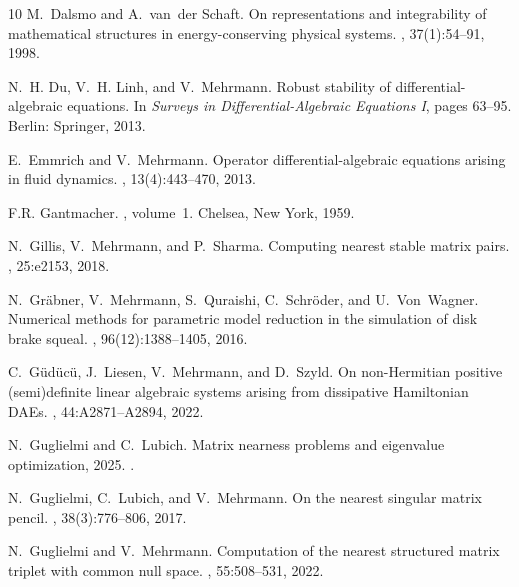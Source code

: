 \documentclass[11pt]{article}
\begin{document}
\begin{thebibliography}{10}
M.~Dalsmo and A.~van~der Schaft.
\newblock On representations and integrability of mathematical structures in
  energy-conserving physical systems.
, 37(1):54--91, 1998.

N.~H. {Du}, V.~H. {Linh}, and V.~{Mehrmann}.
\newblock Robust stability of differential-algebraic equations.
\newblock In {\em Surveys in Differential-Algebraic Equations {I}}, pages
  63--95. Berlin: Springer, 2013.

E.~{Emmrich} and V.~{Mehrmann}.
\newblock Operator differential-algebraic equations arising in fluid dynamics.
, 13(4):443--470, 2013.

F.R. Gantmacher.
, volume~1.
\newblock Chelsea, New York, 1959.

N.~Gillis, V.~Mehrmann, and P.~Sharma.
\newblock Computing nearest stable matrix pairs.
, 25:e2153, 2018.

N.~Gr{\"a}bner, V.~Mehrmann, S.~Quraishi, C.~Schr{\"o}der, and U.~Von~Wagner.
\newblock Numerical methods for parametric model reduction in the simulation of
  disk brake squeal.
, 96(12):1388--1405, 2016.

C.~G{\"u}d{\"u}c{\"u}, J.~Liesen, V.~Mehrmann, and D.~Szyld.
\newblock On non-{H}ermitian positive (semi)definite linear algebraic systems
  arising from dissipative {H}amiltonian {DAE}s.
, 44:A2871--A2894, 2022.

N.~Guglielmi and C.~Lubich.
\newblock Matrix nearness problems and eigenvalue optimization, 2025.
\newblock \href {http://arxiv.org/abs/2503.14750} {}.

N.~Guglielmi, C.~Lubich, and V.~Mehrmann.
\newblock On the nearest singular matrix pencil.
,
  38(3):776--806, 2017.

N.~Guglielmi and V.~Mehrmann.
\newblock Computation of the nearest structured matrix triplet with common null
  space.
, 55:508--531,
  2022.


\end{thebibliography}
\end{document}
